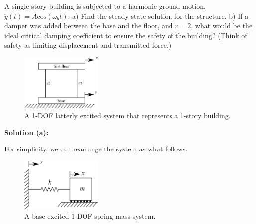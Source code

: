 \documentclass[12pt,letter]{article}
\begin{document}
		\begin{example}

			A single-story building is subjected to a harmonic ground motion, $\ddot{y}(t) = A \text{cos}(\omega_b t)$. a) Find the steady-state solution for the structure.  b) If a damper was added between the base and the floor, and $r=2$, what would be the ideal critical damping coefficient to ensure the safety of the building? (Think of safety as limiting displacement and transmitted force.) 
			\begin{figure}[H]
				\centering
				\includegraphics[width=0.35\textwidth]{../figures/base_excited_structure.png}
				\caption{A 1-DOF latterly excited system that represents a 1-story building. }
			\end{figure}				
						
			\noindent\textbf{Solution (a):}
				
			For simplicity, we can rearrange the system as what follows:
			\begin{figure}[H]
				\centering
				\includegraphics[width=0.35\textwidth]{../figures/base_excited_structure_simple.png}
				\caption{A base excited 1-DOF spring-mass system.}
			\end{figure}			


\end{example}
\end{document}
